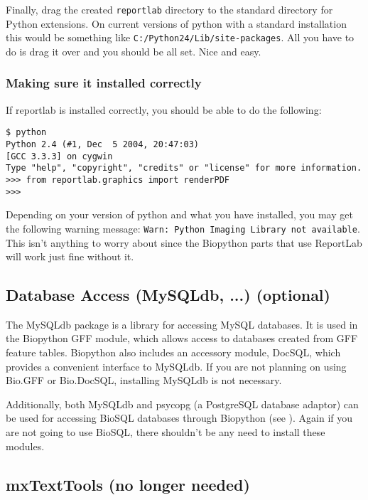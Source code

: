 \documentclass{article}
\begin{document}
Finally, drag the created \verb|reportlab| directory to the standard
directory for Python extensions. On current versions of python with a
standard installation this would be something like 
\verb|C:/Python24/Lib/site-packages|. All you have to do is drag it over
and you should be all set. Nice and easy.

\subsubsection{Making sure it installed correctly}

If reportlab is installed correctly, you should be able to do the
following:

\begin{verbatim}
$ python
Python 2.4 (#1, Dec  5 2004, 20:47:03)
[GCC 3.3.3] on cygwin
Type "help", "copyright", "credits" or "license" for more information.
>>> from reportlab.graphics import renderPDF
>>>
\end{verbatim}

Depending on your version of python and what you have installed, you may
get the following warning message: 
\verb|Warn: Python Imaging Library not available|.  This isn't anything
to worry about since the Biopython parts that use ReportLab will work
just fine without it.

\subsection{Database Access (MySQLdb, ...) (optional)}

The MySQLdb package is a library for accessing MySQL databases. It is
used in the Biopython GFF module, which allows access to databases
created from GFF feature tables. Biopython also includes an accessory
module, DocSQL, which provides a convenient interface to MySQLdb. 
If you are not planning on using Bio.GFF or Bio.DocSQL, installing
MySQLdb is not necessary.

Additionally, both MySQLdb and psycopg (a PostgreSQL database adaptor)
can be used for accessing BioSQL databases through Biopython
(see ). Again if
you are not going to use BioSQL, there shouldn't be any need to install
these modules.

\subsection{mxTextTools (no longer needed)}
\end{document}
